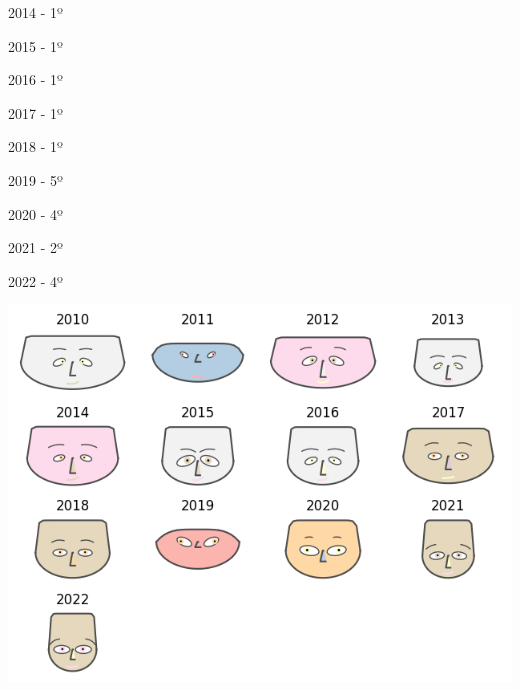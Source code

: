 \documentclass[
]{book}
\begin{document}
2014 - 1º

2015 - 1º

2016 - 1º

2017 - 1º

2018 - 1º

2019 - 5º

2020 - 4º

2021 - 2º

2022 - 4º

\includegraphics{imagens/23.png}

  
\end{document}
